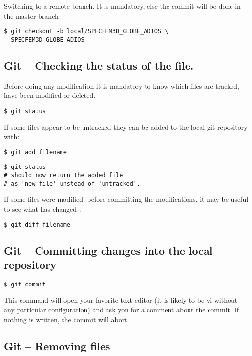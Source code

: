 \documentclass[11pt,twoside]{article}
\begin{document}
Switching to a remote branch. It is mandatory, else the commit will be done in the master branch
\begin{verbatim}
$ git checkout -b local/SPECFEM3D_GLOBE_ADIOS \
  SPECFEM3D_GLOBE_ADIOS
\end{verbatim}

\subsection*{Git -- Checking the status of the file.}
Before doing any modification it is mandatory to know which files are tracked, have been modified or deleted.

\begin{verbatim}
$ git status
\end{verbatim}

If some files appear to be untracked they can be added to the local git repository with:

\begin{verbatim}
$ git add filename
\end{verbatim}

\begin{verbatim}
$ git status 
# should now return the added file
# as 'new file' unstead of 'untracked'.
\end{verbatim}

If some files were modified, before committing the modifications, it may be useful to see what has changed :

\begin{verbatim}
$ git diff filename
\end{verbatim}

\subsection*{Git -- Committing changes into the local repository}


\begin{verbatim}
$ git commit
\end{verbatim}

This command will open your favorite text editor (it is likely to be vi without any particular configuration) and ask you for a comment about the commit. If nothing is written, the commit will abort.

\subsection*{Git -- Removing files}
\end{document}
